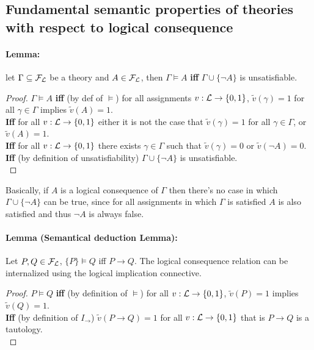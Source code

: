 	\newpage

	\subsection{Fundamental semantic properties of theories with respect to logical consequence}

	\paragraph{Lemma:} let $\Gamma \subseteq \mathcal{F}_\mathcal{L}$ be a theory and $A \in \mathcal{F}_\mathcal{L}$, then $\Gamma \models A$ \textbf{iff} $\Gamma \cup \{\neg A\}$ is unsatisfiable.\\

	\begin{proof}
		$\Gamma \models A$ \textbf{iff} (by def of $\models$) for all assignments $v: \mathcal{L} \rightarrow \{0,1\}$, $\tilde{v} (\gamma) =1$ for all $\gamma \in \Gamma$ implies $\tilde{v} (A) = 1$.\\

		\textbf{Iff} for all $v: \mathcal{L} \rightarrow \{0,1\}$ either it is not the case that $\tilde{v} (\gamma) = 1$ for all $\gamma \in \Gamma$, or $\tilde{v} (A) = 1$.\\

		\textbf{Iff} for all $v: \mathcal{L} \rightarrow \{0,1\}$ there exists $\gamma \in \Gamma$ such that $\tilde{v} (\gamma) = 0$ or $\tilde{v} (\neg A) = 0$.\\

		\textbf{Iff} (by definition of unsatisfiability) $\Gamma \cup \{\neg A\}$ is unsatisfiable.\\
	\end{proof}

	Basically, if $A$ is a logical consequence of $\Gamma$ then there's no case in which  $\Gamma \cup \{\neg A\}$ can be true, since for all assignments in which $\Gamma$ is satisfied $A$ is also satisfied and thus $\neg A$ is always false.\\

	\newpage

	\paragraph{Lemma (Semantical deduction Lemma):} Let $P,Q \in \mathcal{F}_\mathcal{L}$, $\{P\} \models Q$ iff $P \rightarrow Q$.  The logical consequence relation can be internalized using the logical implication connective.\\

	\begin{proof}
		$P \models Q$ \textbf{iff} (by definition of $\models$) for all $v: \mathcal{L} \rightarrow \{0,1\}$, $\tilde{v} (P) = 1$ implies $\tilde{v} (Q) = 1$.\\

		\textbf{Iff} (by definition of $I_\rightarrow$) $\tilde{v} (P \rightarrow Q) = 1$ for all $v: \mathcal{L} \rightarrow \{0,1\}$ that is $P \rightarrow Q$ is a tautology.\\
	\end{proof}

